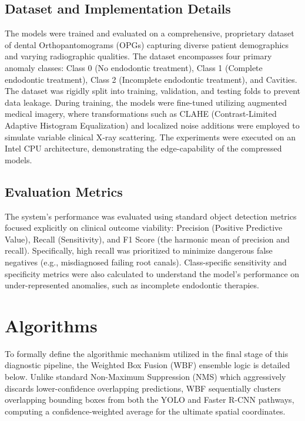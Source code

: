 \documentclass[conference]{IEEEtran}
\begin{document}
\subsection{Dataset and Implementation Details}
The models were trained and evaluated on a comprehensive, proprietary dataset of dental Orthopantomograms (OPGs) capturing diverse patient demographics and varying radiographic qualities. The dataset encompasses four primary anomaly classes: Class 0 (No endodontic treatment), Class 1 (Complete endodontic treatment), Class 2 (Incomplete endodontic treatment), and Cavities. The dataset was rigidly split into training, validation, and testing folds to prevent data leakage. During training, the models were fine-tuned utilizing augmented medical imagery, where transformations such as CLAHE (Contrast-Limited Adaptive Histogram Equalization) and localized noise additions were employed to simulate variable clinical X-ray scattering. The experiments were executed on an Intel CPU architecture, demonstrating the edge-capability of the compressed models.

\subsection{Evaluation Metrics}
The system's performance was evaluated using standard object detection metrics focused explicitly on clinical outcome viability: Precision (Positive Predictive Value), Recall (Sensitivity), and F1 Score (the harmonic mean of precision and recall). Specifically, high recall was prioritized to minimize dangerous false negatives (e.g., misdiagnosed failing root canals). Class-specific sensitivity and specificity metrics were also calculated to understand the model's performance on under-represented anomalies, such as incomplete endodontic therapies.


\section{Algorithms}

To formally define the algorithmic mechanism utilized in the final stage of this diagnostic pipeline, the Weighted Box Fusion (WBF) ensemble logic is detailed below. Unlike standard Non-Maximum Suppression (NMS) which aggressively discards lower-confidence overlapping predictions, WBF sequentially clusters overlapping bounding boxes from both the YOLO and Faster R-CNN pathways, computing a confidence-weighted average for the ultimate spatial coordinates.
\end{document}
